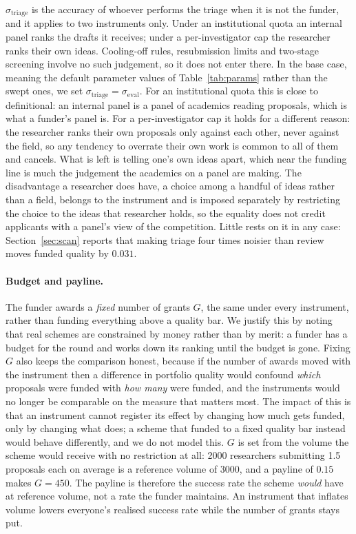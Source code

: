 \documentclass[11pt,a4paper]{article}
\begin{document}
$\sigma_{\text{triage}}$ is the accuracy of whoever performs the triage when it is
not the funder, and it applies to two instruments only. Under an institutional
quota an internal panel ranks the drafts it receives; under a per-investigator cap
the researcher ranks their own ideas. Cooling-off rules, resubmission limits and
two-stage screening involve no such judgement, so it does not enter there. In the base
case, meaning the default parameter values of Table~\ref{tab:params} rather than
the swept ones, we set $\sigma_{\text{triage}} = \sigma_{\text{eval}}$. For an
institutional quota this is close to definitional: an internal panel is a panel of
academics reading proposals, which is what a funder's panel is. For a
per-investigator cap it holds for a different reason: the researcher ranks their
own proposals only against each other, never against the field, so any tendency to
overrate their own work is common to all of them and cancels. What is left is
telling one's own ideas apart, which near the funding line is much the judgement
the academics on a panel are making. The disadvantage a researcher does have, a
choice among a handful of ideas rather than a field, belongs to the instrument and
is imposed separately by restricting the choice to the ideas that researcher
holds, so the equality does not credit applicants with a panel's view of the
competition. Little rests on it in any case: Section~\ref{sec:scan} reports that
making triage four times noisier than review moves funded quality by $0.031$.

\paragraph{Budget and payline.} The funder awards a \emph{fixed} number of grants
$G$, the same under every instrument, rather than funding everything above a
quality bar. We justify this by noting that real schemes are constrained
by money rather than by merit: a funder has a budget for the round and works down
its ranking until the budget is gone. Fixing $G$ also keeps the comparison
honest, because if the number of awards moved with the instrument then a
difference in portfolio quality would confound \emph{which} proposals were funded with
\emph{how many} were funded, and the instruments would no longer be comparable on the measure
that matters most. The impact of this  is that an instrument cannot register
its effect by changing how much gets funded, only by changing what does; a scheme
that funded to a fixed quality bar instead would behave differently, and we do not
model this. $G$ is set from the volume the scheme
would receive with no restriction at all: 2000 researchers submitting 1.5
proposals each on average is a reference volume of 3000, and a payline of $0.15$
makes $G = 450$. The payline is therefore the success rate the scheme \emph{would}
have at reference volume, not a rate the funder maintains. An instrument that
inflates volume lowers everyone's realised success rate while the number of grants
stays put.
\end{document}
